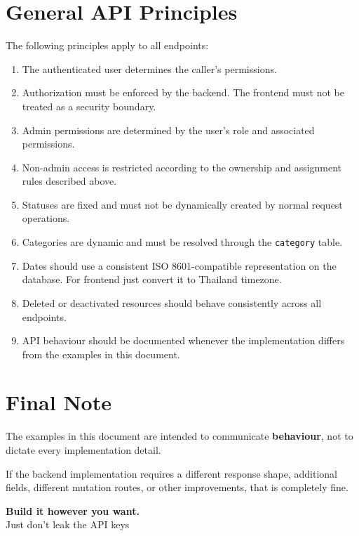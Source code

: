 \documentclass[11pt,a4paper]{article}
\begin{document}
\section{General API Principles}

The following principles apply to all endpoints:

\begin{enumerate}
    \item The authenticated user determines the caller's
          permissions.

    \item Authorization must be enforced by the backend.
          The frontend must not be treated as a security
          boundary.

    \item Admin permissions are determined by the user's role
          and associated permissions.

    \item Non-admin access is restricted according to the
          ownership and assignment rules described above.

    \item Statuses are fixed and must not be dynamically
          created by normal request operations.

    \item Categories are dynamic and must be resolved through
          the \texttt{category} table.

    \item Dates should use a consistent ISO 8601-compatible
          representation on the database. For frontend just convert it to Thailand timezone.

    \item Deleted or deactivated resources should behave
          consistently across all endpoints.

    \item API behaviour should be documented whenever the
          implementation differs from the examples in this
          document.
\end{enumerate}


\section{Final Note}

The examples in this document are intended to communicate
\textbf{behaviour}, not to dictate every implementation detail.

If the backend implementation requires a different response
shape, additional fields, different mutation
routes, or other improvements, that is completely fine.

\begin{center}
\Large
\textbf{Build it however you want.}\\[2mm]
\normalsize
Just don't leak the API keys
\end{center}
\end{document}
